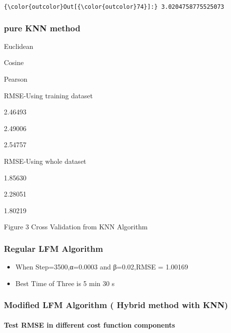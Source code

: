 \documentclass[11pt]{article}
\providecommand{\tightlist}{%
      \setlength{\itemsep}{0pt}\setlength{\parskip}{0pt}}
\begin{document}
            \begin{Verbatim}[commandchars=\\\{\}]
{\color{outcolor}Out[{\color{outcolor}74}]:} 3.0204758775525073
\end{Verbatim}
        
    \subsubsection{pure KNN method}\label{pure-knn-method}

    Euclidean

Cosine

Pearson

RMSE-Using training dataset

2.46493

2.49006

2.54757

RMSE-Using whole dataset

1.85630

2.28051

1.80219

     Figure 3 Cross Validation from KNN Algorithm

    \subsubsection{Regular LFM Algorithm}\label{regular-lfm-algorithm}

    \begin{itemize}
\tightlist
\item
  When Step=3500,α=0.0003 and β=0.02,RMSE = 1.00169
\end{itemize}

    \begin{itemize}
\tightlist
\item
  Best Time of Three is 5 min 30 s
\end{itemize}

    \subsubsection{Modified LFM Algorithm ( Hybrid method with
KNN)}\label{modified-lfm-algorithm-hybrid-method-with-knn}

    \paragraph{Test RMSE in different cost function
components}\label{test-rmse-in-different-cost-function-components}
\end{document}
